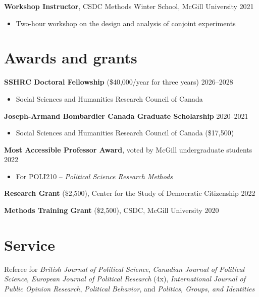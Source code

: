 \documentclass[margin, 10pt]{res}
\begin{document}
\begin{resume}
\textbf{Workshop Instructor}, CSDC Methods Winter School, McGill University \hspace*{0pt}\hfill 2021
\begin{itemize}
	\item Two-hour workshop on the design and analysis of conjoint experiments
\end{itemize}

\section{Awards and grants}

\textbf{SSHRC Doctoral Fellowship} (\$40,000/year for three years) \hspace*{0pt}\hfill 2026--2028
\begin{itemize}
	\item Social Sciences and Humanities Research Council of Canada
\end{itemize}

\textbf{Joseph-Armand Bombardier Canada Graduate Scholarship} \hspace*{0pt}\hfill 2020--2021
\begin{itemize}
	\item Social Sciences and Humanities Research Council of Canada (\$17,500)
\end{itemize}

\textbf{Most Accessible Professor Award}, voted by McGill undergraduate students \hspace*{0pt}\hfill 2022
\begin{itemize}
	\item For POLI210 -- \textit{Political Science Research Methods}
\end{itemize}

\textbf{Research Grant} (\$2,500), Center for the Study of Democratic Citizenship \hspace*{0pt}\hfill 2022

\textbf{Methods Training Grant} (\$2,500), CSDC, McGill University \hspace*{0pt}\hfill 2020

\section{Service}

Referee for \textit{British Journal of Political Science}, \textit{Canadian Journal of Political Science}, \textit{European Journal of Political Research} (4x), \textit{International Journal of Public Opinion Research}, \textit{Political Behavior}, and \textit{Politics, Groups, and Identities}


\end{resume}
\end{document}
